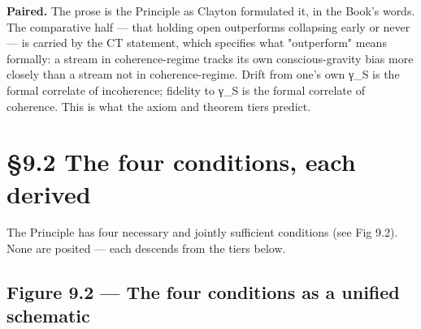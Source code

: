 \documentclass[11pt, openany]{book}
\newcommand{\sectionbreak}{\clearpage}
\begin{document}
\textbf{Paired.} The prose is the Principle as Clayton formulated it, in the Book's words. The comparative half --- that holding open outperforms collapsing early or never --- is carried by the CT statement, which specifies what "outperform" means formally: a stream in coherence-regime tracks its own conscious-gravity bias more closely than a stream not in coherence-regime. Drift from one's own γ\_\allowbreak{}S is the formal correlate of incoherence; fidelity to γ\_\allowbreak{}S is the formal correlate of coherence. This is what the axiom and theorem tiers predict.

\sectionbreak

\section{§9.2 The four conditions, each derived}

The Principle has four necessary and jointly sufficient conditions (see Fig 9.2). None are posited --- each descends from the tiers below.

\subsection{Figure 9.2 --- The four conditions as a unified schematic}
\end{document}
